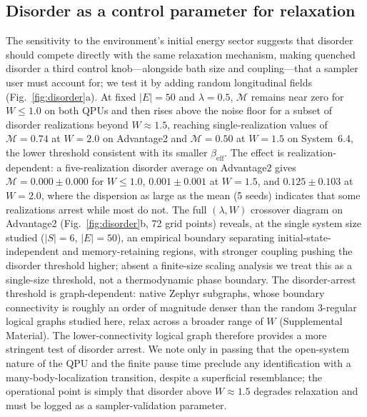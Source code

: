 \documentclass[aps,prapplied,reprint,superscriptaddress,floatfix,nofootinbib]{revtex4-2}
\begin{document}
\subsection{Disorder as a control parameter for relaxation}

The sensitivity to the environment's initial energy sector suggests that disorder should compete directly with the same relaxation mechanism, making quenched disorder a third control knob---alongside bath size and coupling---that a sampler user must account for; we test it by adding random longitudinal fields (Fig.~\ref{fig:disorder}a).
At fixed $|E|=50$ and $\lambda=0.5$, $\mathcal{M}$ remains near zero for $W\leq 1.0$ on both QPUs and then rises above the noise floor for a subset of disorder realizations beyond $W\approx 1.5$, reaching single-realization values of $\mathcal{M}=0.74$ at $W=2.0$ on Advantage2 and $\mathcal{M}=0.50$ at $W=1.5$ on System~6.4, the lower threshold consistent with its smaller $\beta_\mathrm{eff}$.
The effect is realization-dependent: a five-realization disorder average on Advantage2 gives $\mathcal{M}=0.000\pm 0.000$ for $W\leq 1.0$, $0.001\pm 0.001$ at $W=1.5$, and $0.125\pm 0.103$ at $W=2.0$, where the dispersion as large as the mean (5 seeds) indicates that some realizations arrest while most do not.
The full $(\lambda, W)$ crossover diagram on Advantage2 (Fig.~\ref{fig:disorder}b, 72 grid points) reveals, at the single system size studied ($|S|=6$, $|E|=50$), an empirical boundary separating initial-state-independent and memory-retaining regions, with stronger coupling pushing the disorder threshold higher; absent a finite-size scaling analysis we treat this as a single-size threshold, not a thermodynamic phase boundary.
The disorder-arrest threshold is graph-dependent: native Zephyr subgraphs, whose boundary connectivity is roughly an order of magnitude denser than the random 3-regular logical graphs studied here, relax across a broader range of $W$ (Supplemental Material).
The lower-connectivity logical graph therefore provides a more stringent test of disorder arrest. We note only in passing that the open-system nature of the QPU and the finite pause time preclude any identification with a many-body-localization transition, despite a superficial resemblance; the operational point is simply that disorder above $W\approx 1.5$ degrades relaxation and must be logged as a sampler-validation parameter.
\end{document}
